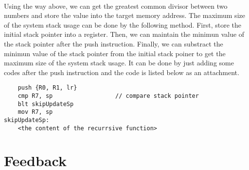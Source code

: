\paragraph{}
Using the way above, we can get the greatest common divisor between two numbers and store the value into the target memory address. The maximum size of the system stack usage can be done by the following method. First, store the initial stack pointer into a register. Then, we can maintain the minimun value of the stack pointer after the push instruction. Finally, we can substract the minimun value of the stack pointer from the initial stack poiner to get the maximum size of the system stack usage. It can be done by just adding some codes after the push instruction and the code is listed below as an attachment.
\begin{lstlisting}
    push {R0, R1, lr}
    cmp R7, sp                  // compare stack pointer
    blt skipUpdateSp
    mov R7, sp
skipUpdateSp:
    <the content of the recurrsive function>
\end{lstlisting}
\section{Feedback}
\paragraph{}
